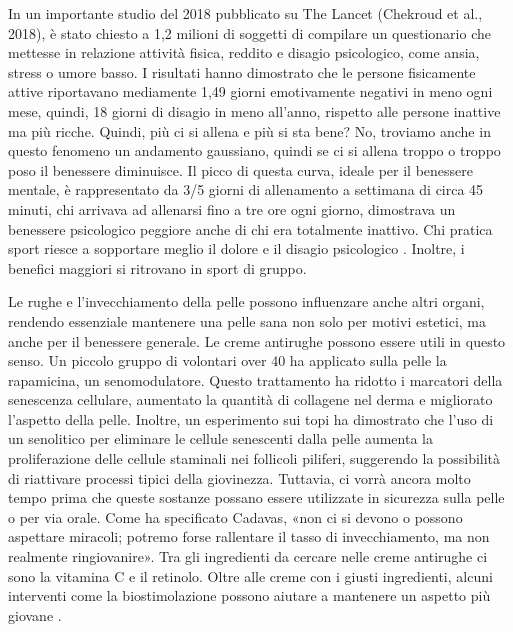 \documentclass[12pt]{book} %
\begin{document}
\begin{mdframed}[linewidth=1pt]
In un importante studio del 2018 pubblicato su The Lancet (Chekroud et al.,
2018), è stato chiesto a 1,2 milioni
di soggetti di compilare un questionario che mettesse in relazione attività fisica, reddito e disagio psicologico, come
ansia, stress o umore basso. I risultati hanno dimostrato che le persone fisicamente attive riportavano mediamente 1,49
giorni emotivamente negativi in meno ogni mese, quindi, 18 giorni di disagio in meno all'anno,
rispetto alle persone inattive ma più ricche. Quindi, più ci si allena e più si sta bene? No, troviamo anche in questo
fenomeno un andamento gaussiano, quindi se ci si allena troppo o troppo poso il benessere diminuisce. Il picco di
questa curva, ideale per il benessere mentale, è rappresentato da 3/5 giorni di allenamento a settimana di circa 45
minuti, chi arrivava ad allenarsi fino a tre ore ogni giorno, dimostrava un benessere psicologico peggiore anche di chi
era totalmente inattivo. Chi pratica sport riesce a sopportare meglio il dolore e il disagio psicologico . Inoltre, i benefici maggiori si ritrovano in sport di gruppo.

Le rughe e l’invecchiamento della pelle possono influenzare anche altri organi, rendendo essenziale mantenere una pelle sana non solo per motivi estetici, ma anche per il benessere generale. Le creme antirughe possono essere utili in questo senso. Un piccolo gruppo di volontari over 40 ha applicato sulla pelle la rapamicina, un senomodulatore. Questo trattamento ha ridotto i marcatori della senescenza cellulare, aumentato la quantità di collagene nel derma e migliorato l’aspetto della pelle. Inoltre, un esperimento sui topi ha dimostrato che l’uso di un senolitico per eliminare le cellule senescenti dalla pelle aumenta la proliferazione delle cellule staminali nei follicoli piliferi, suggerendo la possibilità di riattivare processi tipici della giovinezza. Tuttavia, ci vorrà ancora molto tempo prima che queste sostanze possano essere utilizzate in sicurezza sulla pelle o per via orale. Come ha specificato Cadavas, «non ci si devono o possono aspettare miracoli; potremo forse rallentare il tasso di invecchiamento, ma non realmente ringiovanire». Tra gli ingredienti da cercare nelle creme antirughe ci sono la vitamina C e il retinolo. Oltre alle creme con i giusti ingredienti, alcuni interventi come la biostimolazione possono aiutare a mantenere un aspetto più giovane    .


\end{mdframed}
\end{document}
